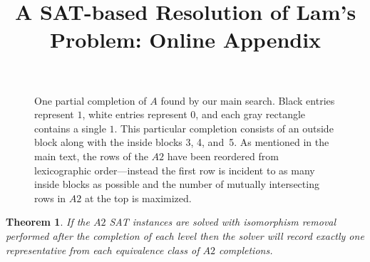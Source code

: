 \documentclass[letterpaper]{article}
\newtheorem{theorem}{Theorem}
\begin{document}
\title{A SAT-based Resolution of Lam's Problem: Online Appendix}
\author{}
\date{}
\maketitle
\addtocounter{table}{1}

\begin{figure}[h!]

\caption*{One partial completion of $A$ found
by our main search.  Black entries represent $1$,
white entries represent $0$, and each gray rectangle
contains a single $1$.
This particular completion consists of an
outside block along with
the inside blocks 3, 4, and~5.
As mentioned in the main text, the rows of the $A2$
have been reordered from lexicographic order---instead
the first row is incident to as many inside blocks as possible
and the number of mutually intersecting rows in $A2$
at the top is maximized.}
\end{figure}

\begin{theorem}\label{thm:record}
If the $A2$ SAT instances are solved with isomorphism removal performed
after the completion of each level then
the solver will record exactly one
representative from each equivalence class
of $A2$ completions.
\end{theorem}
\end{document}
